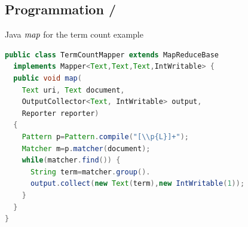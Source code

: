 \subsection{Programmation \hadoop/}

\begin{frame}[fragile]{Java $\mathop{\mathit{map}}$ for the term count example}
\begin{lstlisting}[language=java]
public class TermCountMapper extends MapReduceBase
  implements Mapper<Text,Text,Text,IntWritable> {
  public void map(
    Text uri, Text document,
    OutputCollector<Text, IntWritable> output,
    Reporter reporter)
  {
    Pattern p=Pattern.compile("[\\p{L}]+");
    Matcher m=p.matcher(document);
    while(matcher.find()) {
      String term=matcher.group().
      output.collect(new Text(term),new IntWritable(1));
    }
  }
}
\end{lstlisting}
\end{frame}

